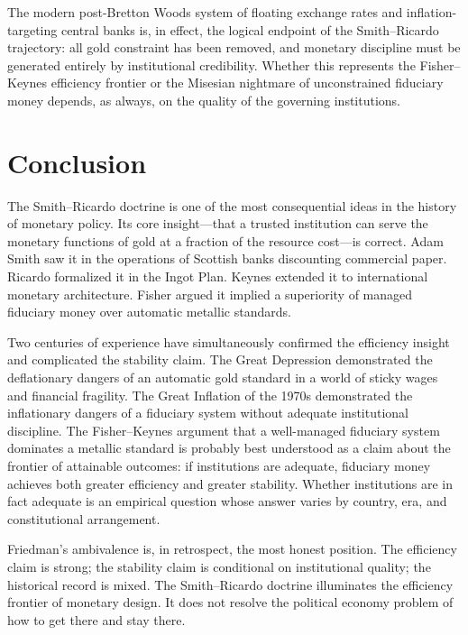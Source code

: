 \documentclass[12pt]{article}
\begin{document}
The modern post-Bretton Woods system of floating exchange rates and
inflation-targeting central banks is, in effect, the logical
endpoint of the Smith--Ricardo trajectory: all gold constraint has
been removed, and monetary discipline must be generated entirely
by institutional credibility.  Whether this represents the
Fisher--Keynes efficiency frontier or the Misesian nightmare of
unconstrained fiduciary money depends, as always, on the
quality of the governing institutions.

\section{Conclusion}
\label{sec:conclusion}

The Smith--Ricardo doctrine is one of the most consequential ideas
in the history of monetary policy.  Its core insight---that a trusted
institution can serve the monetary functions of gold at a fraction
of the resource cost---is correct.  Adam Smith saw it in the
operations of Scottish banks discounting commercial paper.  Ricardo
formalized it in the Ingot Plan.  Keynes extended it to international
monetary architecture.  Fisher argued it implied a superiority of
managed fiduciary money over automatic metallic standards.

Two centuries of experience have simultaneously confirmed the
efficiency insight and complicated the stability claim.  The Great
Depression demonstrated the deflationary dangers of an automatic
gold standard in a world of sticky wages and financial fragility.
The Great Inflation of the 1970s demonstrated the inflationary
dangers of a fiduciary system without adequate institutional
discipline.  The Fisher--Keynes argument that a well-managed
fiduciary system dominates a metallic standard is probably best
understood as a claim about the frontier of attainable outcomes:
if institutions are adequate, fiduciary money achieves both
greater efficiency and greater stability.  Whether institutions
are in fact adequate is an empirical question whose answer varies
by country, era, and constitutional arrangement.

Friedman's ambivalence is, in retrospect, the most honest position.
The efficiency claim is strong; the stability claim is conditional
on institutional quality; the historical record is mixed.  The
Smith--Ricardo doctrine illuminates the efficiency frontier of
monetary design.  It does not resolve the political economy problem
of how to get there and stay there.
\end{document}
